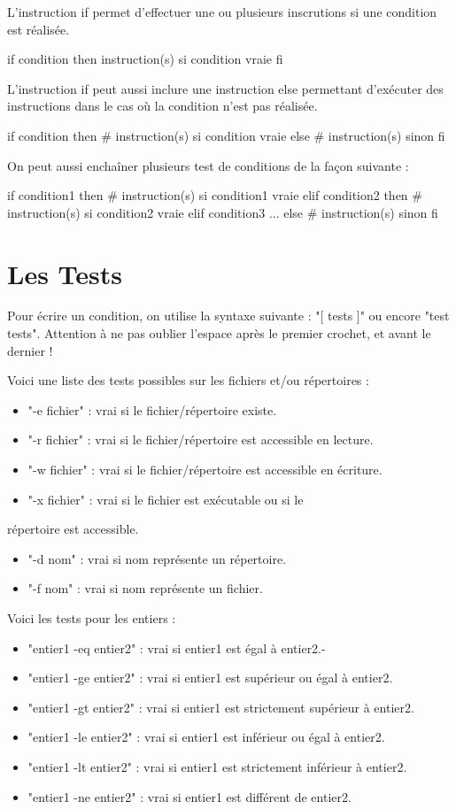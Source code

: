 \documentclass[10pt,a4paper]{article}
\begin{document}
L'instruction if permet d'effectuer une ou plusieurs inscrutions si une condition est réalisée.
\begin{mylisting}
if condition
then
instruction(s) si condition vraie
fi
\end{mylisting}

L'instruction if peut aussi inclure une instruction else permettant d'exécuter des instructions dans le cas où la condition n'est pas réalisée.
\begin{mylisting}
if condition
then
# instruction(s) si condition vraie
else
# instruction(s) sinon
fi
\end{mylisting}
On peut aussi enchaîner plusieurs test de conditions de la façon suivante :
\begin{mylisting}
if condition1
then
# instruction(s) si condition1 vraie
elif condition2
then
# instruction(s) si condition2 vraie
elif condition3
...
else
# instruction(s) sinon
fi
\end{mylisting}

\section{Les Tests}

Pour écrire un condition, on utilise la syntaxe suivante : "[ tests ]" ou encore "test tests". Attention à ne pas oublier l'espace après le premier crochet, et avant le dernier !

Voici une liste des tests possibles sur les fichiers et/ou répertoires :
\begin{itemize}
\item "-e fichier" : vrai si le fichier/répertoire existe.
\item "-r fichier" : vrai si le fichier/répertoire est accessible en lecture.
\item "-w fichier" : vrai si le fichier/répertoire est accessible en écriture.
\item "-x fichier" : vrai si le fichier est exécutable ou si le
\end{itemize}

répertoire est accessible.
\begin{itemize}
\item "-d nom" : vrai si nom représente un répertoire.
\item "-f nom" : vrai si nom représente un fichier.
\end{itemize}
Voici les tests pour les entiers :
\begin{itemize}
  \item "entier1 -eq entier2" : vrai si entier1 est égal à entier2.-
  \item "entier1 -ge entier2" : vrai si entier1 est supérieur ou égal à entier2.
  \item "entier1 -gt entier2" : vrai si entier1 est strictement supérieur à entier2.
  \item "entier1 -le entier2" : vrai si entier1 est inférieur ou égal à entier2.
  \item "entier1 -lt entier2" : vrai si entier1 est strictement inférieur à entier2.
  \item "entier1 -ne entier2" : vrai si entier1 est différent de entier2.  
\end{itemize}
\end{document}
